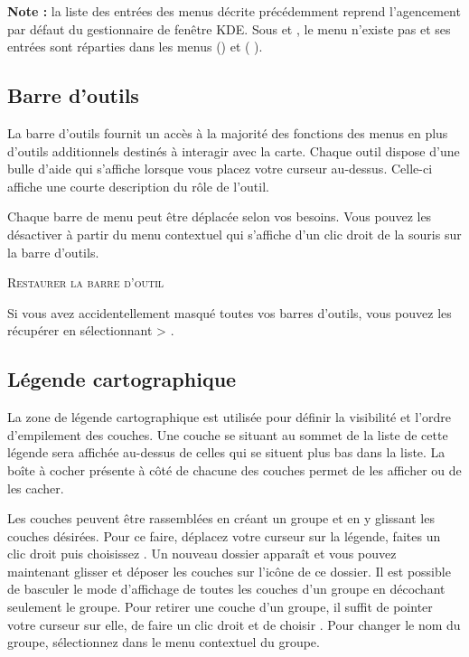 \textbf{Note :} la liste des entrées des menus décrite précédemment reprend l'agencement par défaut du gestionnaire de fenêtre KDE. Sous \osx{} et , le menu  n'existe pas et ses entrées sont réparties dans les menus  (\osx{}) et  (\osx{} \nix{}).

\subsection{Barre d'outils} \label{label_toolbars}

La barre d'outils fournit un accès à la majorité des fonctions des menus en plus d'outils additionnels destinés à interagir avec la carte. Chaque outil dispose d'une bulle d'aide qui s'affiche lorsque vous placez votre curseur au-dessus. Celle-ci affiche une courte description du rôle de l'outil.

Chaque barre de menu peut être déplacée selon vos besoins. Vous pouvez les désactiver à partir du menu contextuel qui s'affiche d'un clic droit de la souris sur la barre d'outils.

\begin{Tip}
\caption{\textsc{Restaurer la barre d'outil}} 
Si vous avez accidentellement masqué toutes vos barres d'outils, vous pouvez les récupérer en sélectionnant  > .
\end{Tip}

\subsection{Légende cartographique} \label{label_legend}

La zone de légende cartographique est utilisée pour définir la visibilité et l'ordre d'empilement des couches. Une couche se situant au sommet de la liste de cette légende sera affichée au-dessus de celles qui se situent plus bas dans la liste. La boîte à cocher présente à côté de chacune des couches permet de les afficher ou de les cacher.

Les couches peuvent être rassemblées en créant un groupe et en y glissant les couches désirées. Pour ce faire, déplacez votre curseur sur la légende, faites un clic droit puis choisissez . Un nouveau dossier apparaît et vous pouvez maintenant glisser et déposer les couches sur l'icône de ce dossier. Il est possible de basculer le mode d'affichage de toutes les couches d'un groupe en décochant seulement le groupe. Pour retirer une couche d'un groupe, il suffit de pointer votre curseur sur elle, de faire un clic droit et de choisir . Pour changer le nom du groupe, sélectionnez  dans le menu contextuel du groupe.

